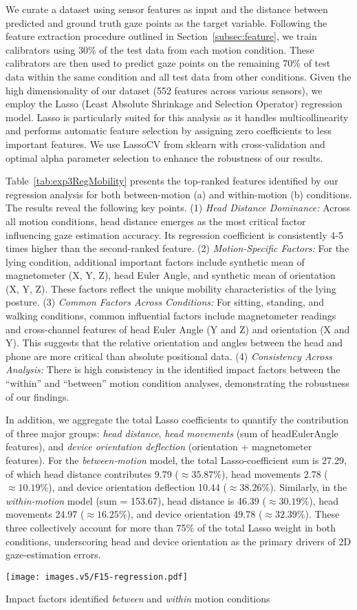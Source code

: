We curate a dataset using sensor features as input and the distance between predicted and ground truth gaze points as the target variable. Following the feature extraction procedure outlined in Section~\ref{subsec:feature}, we train calibrators using 30\% of the test data from each motion condition. These calibrators are then used to predict gaze points on the remaining 70\% of test data within the same condition and all test data from other conditions.
Given the high dimensionality of our dataset (552 features across various sensors), we employ the Lasso (Least Absolute Shrinkage and Selection Operator) regression model. Lasso is particularly suited for this analysis as it handles multicollinearity and performs automatic feature selection by assigning zero coefficients to less important features. We use LassoCV from sklearn with cross-validation and optimal alpha parameter selection to enhance the robustness of our results.

Table~\ref{tab:exp3RegMobility} presents the top-ranked features identified by our regression analysis for both between-motion (a) and within-motion (b) conditions. The results reveal the following key points. (1) \textit{Head Distance Dominance:} Across all motion conditions, head distance emerges as the most critical factor influencing gaze estimation accuracy. Its regression coefficient is consistently 4-5 times higher than the second-ranked feature. (2) \textit{Motion-Specific Factors:} For the lying condition, additional important factors include synthetic mean of magnetometer (X, Y, Z), head Euler Angle, and synthetic mean of orientation (X, Y, Z). These factors reflect the unique mobility characteristics of the lying posture. (3) \textit{Common Factors Across Conditions:} For sitting, standing, and walking conditions, common influential factors include magnetometer readings and cross-channel features of head Euler Angle (Y and Z) and orientation (X and Y). This suggests that the relative orientation and angles between the head and phone are more critical than absolute positional data. (4) \textit{Consistency Across Analysis:} There is high consistency in the identified impact factors between the ``within'' and ``between'' motion condition analyses, demonstrating the robustness of our findings.

In addition, we aggregate the total Lasso coefficients to quantify the contribution of three major groups:
\emph{head distance}, \emph{head movements} (sum of headEulerAngle features), and \emph{device orientation deflection} (orientation + magnetometer features). For the \textit{between‐motion} model, the total Lasso‐coefficient sum is 27.29, of which head distance contributes 9.79 (\(\approx35.87\%\)), head movements 2.78 (\(\approx10.19\%\)), and device orientation deflection 10.44 (\(\approx38.26\%\)). Similarly, in the \textit{within‐motion} model (sum = 153.67), head distance is 46.39 (\(\approx30.19\%\)), head movements 24.97 (\(\approx16.25\%\)), and device orientation 49.78 (\(\approx32.39\%\)). These three collectively account for more than 75\% of the total Lasso weight in both conditions, underscoring head and device orientation as the primary drivers of 2D gaze‐estimation errors.


\begin{table}[!htbp]
\centering
\texttt{[image: images.v5/F15-regression.pdf]}
\caption{Impact factors identified \textit{between} and \textit{within} motion conditions}\label{tab:exp3RegMobility}
\end{table}


